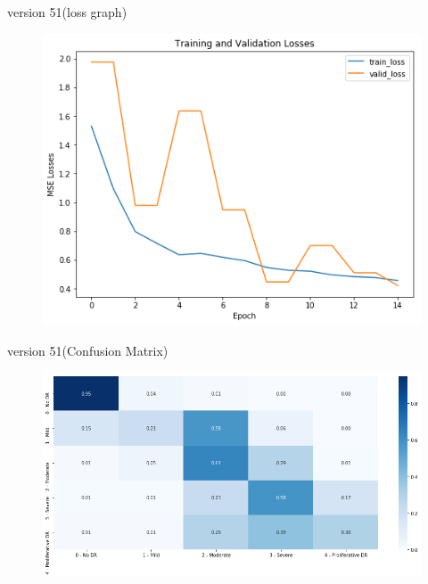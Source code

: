 \documentclass[10pt]{beamer}
\begin{document}
			\begin{frame}{version 51(loss graph)}
				\begin{figure}
					\includegraphics[scale=.5]{Results/v51lossgraph.png}
				\end{figure}
			\end{frame}
			\begin{frame}{version 51(Confusion Matrix)}
				\begin{figure}
					\includegraphics[width=\linewidth]{Results/v51confusionmatrix.png}
				\end{figure}
			\end{frame}
\end{document}
